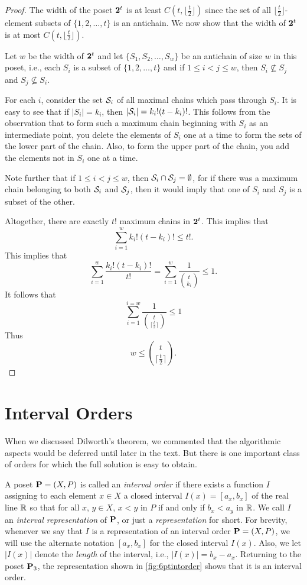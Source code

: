 \begin{proof}
The width of the poset $\mathbf{2}^t$ is at least
$C(t,\lfloor\frac{t}{2}\rfloor)$ since the set of all
$\lfloor\frac{t}{2}\rfloor$-element subsets of $\{1,2,\dots,t\}$ is an
antichain.  We now show that the width of $\mathbf{2}^t$ is at most
$C(t,\lfloor\frac{t}{2}\rfloor)$.

Let $w$ be the width of $\mathbf{2}^t$ and let $\{S_1,S_2,\dots, S_w\}$ be
an antichain of size $w$ in this poset, i.e., each $S_i$ is a subset
of $\{1,2,\dots,t\}$ and if $1\le i<j\le w$, then $S_i\nsubseteq
S_j$ and $S_j\nsubseteq S_i$.

For each $i$, consider the set $\mathcal{S}_i$ of all maximal chains which
pass through $S_i$.  It is easy to see that if $|S_i|=k_i$, then
$|\mathcal{S}_i|=k_i!(t-k_i)!$.  This follows from the observation that to
form such a maximum chain beginning with $S_i$ as an intermediate
point, you delete the elements of $S_i$ one at a time to form the
sets of the lower part of the chain.  Also, to form the upper part
of the chain, you add the elements not in $S_i$ one at a time.

Note further that if $1\le i <j\le w$, then $\mathcal{S}_i\cap \mathcal{S}_j
=\emptyset$, for if there was a maximum chain belonging to both
$\mathcal{S}_i$ and $\mathcal{S}_j$, then it would imply that one of $S_i$ and
$S_j$ is a subset of the other.

Altogether, there are exactly $t!$ maximum chains in $\mathbf{2}^t$.  This
implies that
\[\sum_{i=1}^{w} k_i!(t-k_i)!\le t!.\]
This implies that
\[\sum_{i=1}^{w}\frac{k_i!(t-k_i)!}{t!}=
\sum_{i=1}^{w}\frac{1}{\binom{t}{k_i}}\le 1. 
\]
It follows that
\[
\sum_{i=1}^{i=w}\frac{1}{\binom{t}{\lceil\frac{t}{2}\rceil}}\le 1
\]
Thus
\[
w\le \binom{t}{\lceil\frac{t}{2}\rceil}.
\]
\end{proof}

\section{Interval Orders}\label{s:posets:intervalorder}

When we discussed Dilworth's theorem, we commented that the
algorithmic aspects would be deferred until later in the text.  But
there is one important class of orders for which the full solution is
easy to obtain.

A poset $\mathbf{P}=(X,P)$ is called an \textit{interval order} if there exists a
function $I$ assigning to each element $x\in X$ a closed interval
$I(x)=[a_x,b_x]$ of the real line $\mathbb{R}$ so that for all $x$, $y\in
X$, $x<y$ in $P$ if and only if $b_x<a_y$ in $\mathbb{R}$.  We call $I$ an
\textit{interval representation} of $\mathbf{P}$, or just a
\textit{representation} for short.  For brevity, whenever we say that
$I$ is a representation of an interval order $\mathbf{P}=(X,P)$, we will use the
alternate notation $[a_x,b_x]$ for the closed interval $I(x)$.  Also,
we let $|I(x)|$ denote the \textit{length} of the interval, i.e.,
$|I(x)|=b_x-a_x$.  Returning to the poset $\mathbf{P}_3$, the representation
shown in \autoref{fig:6ptintorder} shows that it is an interval order.

